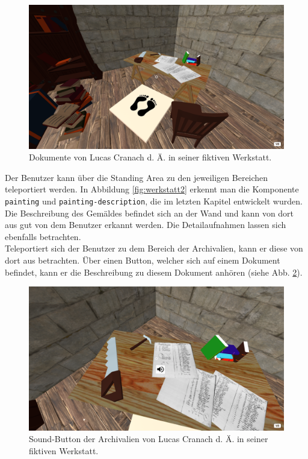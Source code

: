 \documentclass[a4paper,12pt,oneside]{article}
\begin{document}
        \begin{figure}
          \centering
          \includegraphics[scale=0.3]{img/coding/werkstatt1.png}
          \caption{Dokumente von Lucas Cranach d. Ä. in seiner fiktiven Werkstatt.}
          \label{fig:werkstatt1}
        \end{figure}
        Der Benutzer kann über die Standing Area zu den jeweiligen Bereichen
        teleportiert werden. In Abbildung \ref{fig:werkstatt2} erkennt man
        die Komponente \texttt{painting} und \texttt{painting-description},
        die im letzten Kapitel entwickelt wurden. Die Beschreibung des
        Gemäldes befindet sich an der Wand und kann von dort aus gut von
        dem Benutzer erkannt werden. Die Detailaufnahmen lassen
        sich ebenfalls betrachten. \\
        Teleportiert sich der Benutzer zu dem Bereich der Archivalien,
        kann er diese von dort aus betrachten. Über einen Button, welcher
        sich auf einem Dokument befindet, kann er die Beschreibung zu diesem
        Dokument anhören 
        (siehe Abb. \ref{fig:werkstatt3}). \\
        \begin{figure}
          \centering
          \includegraphics[scale=0.3]{img/coding/werkstatt3.png}
          \caption{Sound-Button der Archivalien von Lucas Cranach d. Ä. in seiner fiktiven Werkstatt.}
          \label{fig:werkstatt3}
        \end{figure}
\end{document}

